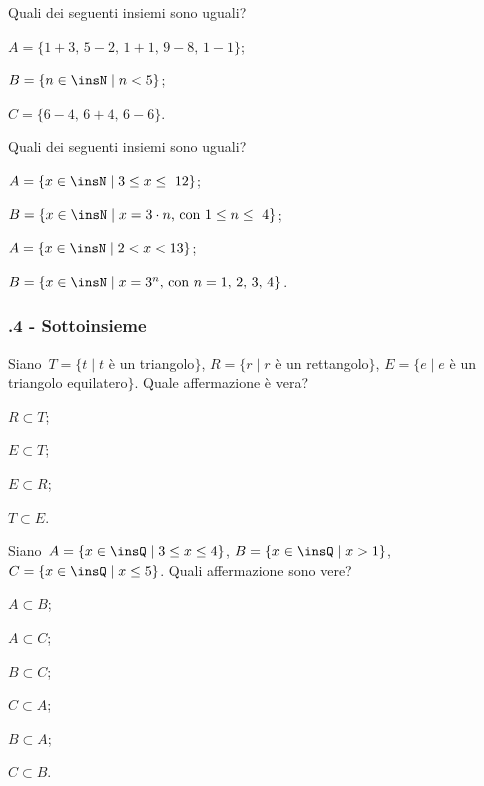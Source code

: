 \begin{esercizio}
\label{ese:\thechapter.39}
Quali dei seguenti insiemi sono uguali?
 \begin{enumeratea}
 \item $A=\{1+3\text{, }5-2\text{, }1+1\text{, }9-8\text{, }1-1\}$;
\item $B=\{n\in\insN\mid n<5\}$;
\item $C=\{6-4\text{, }6+4\text{, }6-6\}$.
 \end{enumeratea}
\end{esercizio}
\pagebreak
\begin{esercizio}
\label{ese:\thechapter.40}
Quali dei seguenti insiemi sono uguali?
\begin{multicols}{2}
\begin{enumeratea}
\item $A=\{x\in\insN\mid 3\le x\le~12\}$;
\item $B=\{x\in\insN\mid x=3\cdot n\text{, con } 1\le n\le~4\}$;
\item $A=\{x\in\insN\mid 2<x<13\}$;
\item $B=\{x\in\insN\mid x=3^{n}\text{, con }n=\text{1, 2, 3, 4}\}$.
\end{enumeratea}
\end{multicols}
\end{esercizio}

\subsubsection*{\thechapter.4 - Sottoinsieme}

\begin{esercizio}
\label{ese:\thechapter.41}
 Siano~$T=\{t\mid t$ è un triangolo$\}$, $R=\{r\mid r$ è un rettangolo$\}$,
$E=\{e\mid e$ è un triangolo equilatero$\}$. Quale affermazione è vera?
\begin{multicols}{4}
\begin{enumeratea}
\item $R\subset T$;
\item $E\subset T$;
\item $E\subset R$;
\item $T\subset E$.
\end{enumeratea}
\end{multicols}
\end{esercizio}

\begin{esercizio}
\label{ese:\thechapter.42}
 Siano~$A=\{x\in \insQ \mid 3\le x \le 4\}$, $B=\{x\in \insQ \mid x>1\}$, $C=\{x\in \insQ \mid x \le 5\}$. Quali affermazione sono vere?
\begin{multicols}{3}
\begin{enumeratea}
\item $A\subset B$;
\item $A\subset C$;
\item $B\subset C$;
\item $C\subset A$;
\item $B\subset A$;
\item $C\subset B$.
\end{enumeratea}
\end{multicols}
\end{esercizio}

